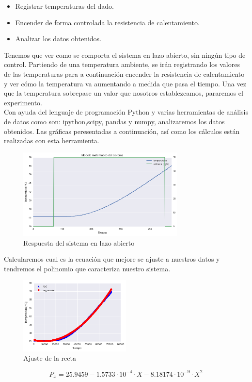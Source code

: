 \begin{itemize}
	\item{Registrar temperaturas del dado.}
	\item{Encender de forma controlada la resistencia de calentamiento.}
	\item{Analizar los datos obtenidos.}
\end{itemize}

Tenemos que ver como se comporta el sistema en lazo abierto, sin ningún tipo de control. Partiendo de una temperatura ambiente, se irán registrando los valores de las temperaturas para a continuación encender la resistencia de calentamiento y ver cómo la temperatura va aumentando a medida que pasa el tiempo. Una vez que la temperatura sobrepase un valor que nosotros establezcamos, pararemos el experimento.\\

Con ayuda del lenguaje de programación Python y varias herramientas de análisis de datos como son: ipython,scipy, pandas y numpy, analizaremos los datos obtenidos. Las gráficas peresentadas a continuación, así como los cálculos están realizadas con esta herramienta.

    \begin{figure}[H]
            \centering
            \includegraphics[width=0.75\textwidth]{images/PLC/modelado/modelado_9_1.png}
            \caption{Respuesta del sistema en lazo abierto}
            \label{fig:plc_lazo_abierto}
    \end{figure}

Calcularemos cual es la ecuación que mejore se ajuste a nuestros datos y tendremos el polinomio que caracteriza nuestro sistema.
    \begin{figure}[H]
            \centering
            \includegraphics[width=0.5\textwidth]{images/PLC/modelado/modelado_13_1.png}
            \caption{Ajuste de la recta}
            \label{fig:plc_lazo_abierto2}
    \end{figure}
$$P_x=  25.9459 -1.5733 \cdot 10^{-4} \cdot X - 8.18174 \cdot 10^{-9} \cdot X^2$$


